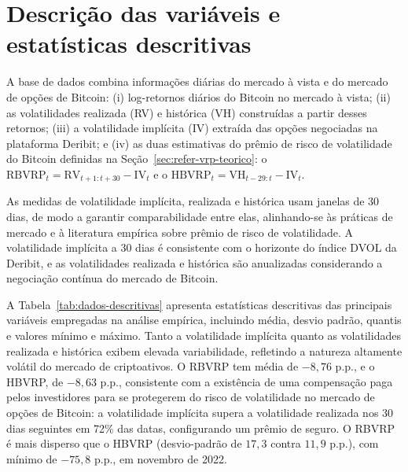 \section{Descrição das variáveis e estatísticas descritivas}
\label{sec:dados-descritivas}

A base de dados combina informações diárias do mercado à vista e do mercado de
opções de Bitcoin: (i) log-retornos diários do Bitcoin no mercado à vista;
(ii) as volatilidades realizada (RV) e histórica (VH) construídas a partir
desses retornos; (iii) a volatilidade implícita (IV) extraída das opções
negociadas na plataforma Deribit; e (iv) as duas estimativas do prêmio de
risco de volatilidade do Bitcoin definidas na
Seção~\ref{sec:refer-vrp-teorico}: o
$\text{RBVRP}_t = \text{RV}_{t+1:t+30} - \text{IV}_t$ e o
$\text{HBVRP}_t = \text{VH}_{t-29:t} - \text{IV}_t$.

As medidas de volatilidade implícita, realizada e histórica usam janelas de 30
dias, de modo a garantir comparabilidade entre elas, alinhando-se às práticas de
mercado e à literatura empírica sobre prêmio de risco de volatilidade. A
volatilidade implícita a 30 dias é consistente com o horizonte do índice DVOL
da Deribit, e as volatilidades realizada e histórica são anualizadas
considerando a negociação contínua do mercado de Bitcoin.

A Tabela~\ref{tab:dados-descritivas} apresenta estatísticas descritivas das
principais variáveis empregadas na análise empírica, incluindo média, desvio
padrão, quantis e valores mínimo e máximo. Tanto a volatilidade implícita
quanto as volatilidades realizada e histórica exibem elevada variabilidade,
refletindo a natureza altamente volátil do mercado de criptoativos. O RBVRP
tem média de $-8{,}76$ p.p., e o HBVRP, de $-8{,}63$ p.p., consistente com a
existência de
uma compensação paga pelos investidores para se protegerem do risco de
volatilidade no mercado de opções de Bitcoin: a volatilidade implícita supera
a volatilidade realizada nos 30 dias seguintes em 72\% das datas, configurando
um prêmio de seguro. O RBVRP é mais disperso que o HBVRP (desvio-padrão de
$17{,}3$ contra $11{,}9$ p.p.), com mínimo de $-75{,}8$ p.p., em novembro de
2022.

